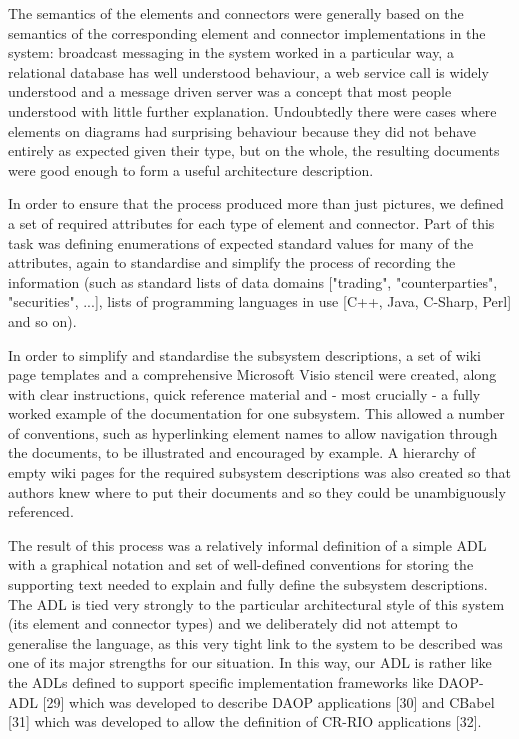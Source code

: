\begin{itemise}
  The semantics of the elements and connectors were generally based on the semantics of the corresponding element and connector implementations in the system: broadcast messaging in the system worked in a particular way, a relational database has well understood behaviour, a web service call is widely understood and a message driven server was a concept that most people understood with little further explanation.  Undoubtedly there were cases where elements on diagrams had surprising behaviour because they did not behave entirely as expected given their type, but on the whole, the resulting documents were good enough to form a useful architecture description.

  In order to ensure that the process produced more than just pictures, we defined a set of required attributes for each type of element and connector.  Part of this task was defining enumerations of expected standard values for many of the attributes, again to standardise and simplify the process of recording the information (such as standard lists of data domains ["trading", "counterparties", "securities", ...], lists of programming languages in use [C++, Java, C-Sharp, Perl] and so on).

  In order to simplify and standardise the subsystem descriptions, a set of wiki page templates and a comprehensive Microsoft Visio stencil were created, along with clear instructions, quick reference material and - most crucially - a fully worked example of the documentation for one subsystem.  This allowed a number of conventions, such as hyperlinking element names to allow navigation through the documents, to be illustrated and encouraged by example.  A hierarchy of empty wiki pages for the required subsystem descriptions was also created so that authors knew where to put their documents and so they could be unambiguously referenced.

  The result of this process was a relatively informal definition of a simple ADL with a graphical notation and set of well-defined conventions for storing the supporting text needed to explain and fully define the subsystem descriptions.  The ADL is tied very strongly to the particular architectural style of this system (its element and connector types) and we deliberately did not attempt to generalise the language, as this very tight link to the system to be described was one of its major strengths for our situation.  In this way, our ADL is rather like the ADLs defined to support specific implementation frameworks like DAOP-ADL [29] which was developed to describe DAOP applications [30] and CBabel [31] which was developed to allow the definition of CR-RIO applications [32].


\end{itemise}
